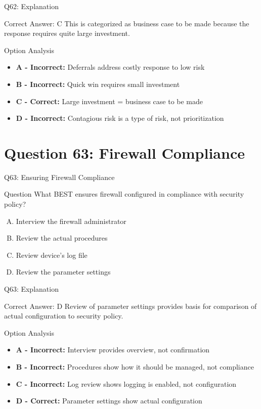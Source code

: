 \documentclass{beamer}
\begin{document}
	\begin{frame}{Q62: Explanation}
		\begin{block}{Correct Answer: C}
			This is categorized as business case to be made because the response requires quite large investment.
		\end{block}
		\begin{block}{Option Analysis}
			\begin{itemize}
				\item \textbf{A - Incorrect:} Deferrals address costly response to low risk
				\item \textbf{B - Incorrect:} Quick win requires small investment
				\item \textbf{C - Correct:} Large investment = business case to be made
				\item \textbf{D - Incorrect:} Contagious risk is a type of risk, not prioritization
			\end{itemize}
		\end{block}
	\end{frame}
	
	\section{Question 63: Firewall Compliance}
	
	\begin{frame}{Q63: Ensuring Firewall Compliance}
		\begin{block}{Question}
			What BEST ensures firewall configured in compliance with security policy?
		\end{block}
		\begin{enumerate}[(A)]
			\item Interview the firewall administrator
			\item Review the actual procedures
			\item Review device's log file
			\item Review the parameter settings
		\end{enumerate}
	\end{frame}
	
	\begin{frame}{Q63: Explanation}
		\begin{block}{Correct Answer: D}
			Review of parameter settings provides basis for comparison of actual configuration to security policy.
		\end{block}
		\begin{block}{Option Analysis}
			\begin{itemize}
				\item \textbf{A - Incorrect:} Interview provides overview, not confirmation
				\item \textbf{B - Incorrect:} Procedures show how it should be managed, not compliance
				\item \textbf{C - Incorrect:} Log review shows logging is enabled, not configuration
				\item \textbf{D - Correct:} Parameter settings show actual configuration
			\end{itemize}
		\end{block}
	\end{frame}
	
\end{document}
